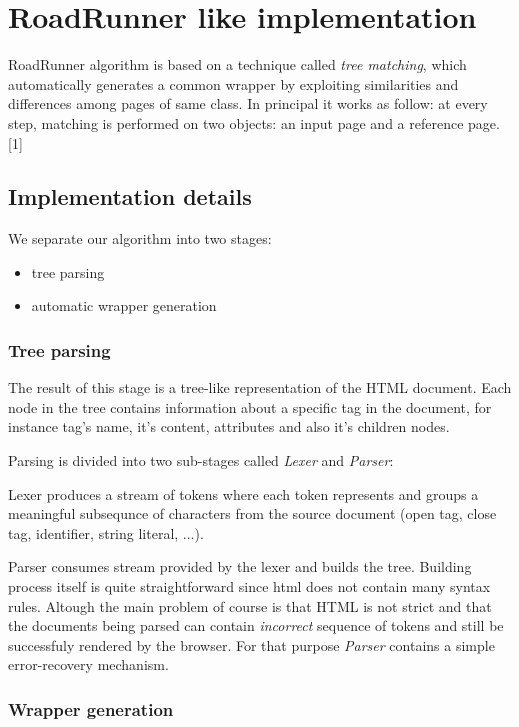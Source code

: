 \documentclass[runningheads]{llncs}
\begin{document}
\section{RoadRunner like implementation}

RoadRunner algorithm is based on a technique called \textit{tree matching}, which automatically generates a common wrapper by exploiting similarities and differences among pages of same class. In principal it works as follow:
at every step, matching is performed on two objects: an input page and a reference page. [1]

\subsection{Implementation details}

We separate our algorithm into two stages:
\begin{itemize}
	\item tree parsing
	\item automatic wrapper generation
\end{itemize}

\subsubsection{Tree parsing}

The result of this stage is a tree-like representation of the HTML document. Each node in the tree contains information about a specific tag in the document, for instance tag's name, it's content, attributes and also it's children nodes. 

Parsing is divided into two sub-stages called \textit{Lexer} and \textit{Parser}:

Lexer produces a stream of tokens where each token represents and groups a meaningful subsequnce of characters from the source document (open tag, close tag, identifier, string literal, ...). 

Parser consumes stream provided by the lexer and builds the tree. Building process itself is quite straightforward since html does not contain many syntax rules. Altough the main problem of course is that HTML is not strict and that the documents being parsed can contain \textit{incorrect} sequence of tokens and still be successfuly rendered by the browser. For that purpose \textit{Parser} contains a simple error-recovery mechanism.

\subsubsection{Wrapper generation}
\end{document}
